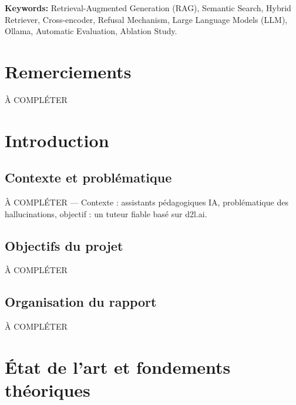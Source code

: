 \documentclass{rapportECL}
\begin{document}
\bigskip
\noindent\textbf{Keywords:}
Retrieval-Augmented Generation (RAG),
Semantic Search,
Hybrid Retriever,
Cross-encoder,
Refusal Mechanism,
Large Language Models (LLM),
Ollama,
Automatic Evaluation,
Ablation Study.

\clearpage

\newpage
\section*{Remerciements}

À COMPLÉTER

\newpage

\tableofcontents
\newpage
{}
\listoffigures
\newpage

\section{Introduction}

\subsection{Contexte et problématique}

À COMPLÉTER — Contexte : assistants pédagogiques IA, problématique des hallucinations, objectif : un tuteur fiable basé sur d2l.ai.

\subsection{Objectifs du projet}

À COMPLÉTER

\subsection{Organisation du rapport}

À COMPLÉTER

\section{État de l'art et fondements théoriques}
\end{document}
